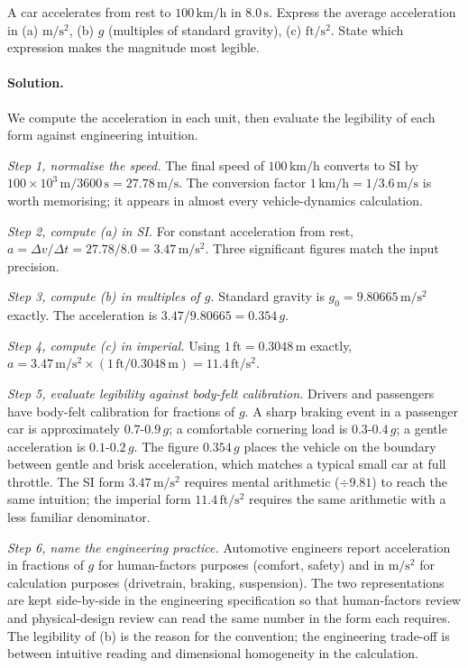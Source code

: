 \begin{exercise}
A car accelerates from rest to $100 \,\si{\kilo\meter\per\hour}$ in
$8.0 \,\si{\second}$. Express the average acceleration in (a)
$\si{\meter\per\second\squared}$, (b) $g$ (multiples of standard
gravity), (c) $\text{ft}/\text{s}^{2}$. State which expression
makes the magnitude most legible.

\paragraph{Solution.}
We compute the acceleration in each unit, then evaluate the
legibility of each form against engineering intuition.

\textit{Step 1, normalise the speed.} The final speed of
$100 \,\si{\kilo\meter\per\hour}$ converts to SI by
$100 \times 10^{3} \,\si{\meter} / 3600 \,\si{\second} =
27.78 \,\si{\meter\per\second}$. The conversion factor
$1 \,\si{\kilo\meter\per\hour} = 1/3.6 \,\si{\meter\per\second}$ is
worth memorising; it appears in almost every vehicle-dynamics
calculation.

\textit{Step 2, compute (a) in SI.} For constant acceleration from
rest, $a = \Delta v / \Delta t = 27.78 / 8.0 = 3.47 \,\si{\meter\per
\second\squared}$. Three significant figures match the input
precision.

\textit{Step 3, compute (b) in multiples of $g$.} Standard gravity is
$g_{0} = 9.80665 \,\si{\meter\per\second\squared}$ exactly. The
acceleration is $3.47 / 9.80665 = 0.354 \,g$.

\textit{Step 4, compute (c) in imperial.} Using
$1 \,\text{ft} = 0.3048 \,\si{\meter}$ exactly,
$a = 3.47 \,\si{\meter\per\second\squared} \times (1 \,\text{ft}/
0.3048 \,\si{\meter}) = 11.4 \,\text{ft}/\text{s}^{2}$.

\textit{Step 5, evaluate legibility against body-felt calibration.}
Drivers and passengers have body-felt calibration for fractions of
$g$. A sharp braking event in a passenger car is approximately
$0.7$-$0.9 \,g$; a comfortable cornering load is $0.3$-$0.4 \,g$; a
gentle acceleration is $0.1$-$0.2 \,g$. The figure $0.354 \,g$ places
the vehicle on the boundary between gentle and brisk acceleration,
which matches a typical small car at full throttle. The SI form
$3.47 \,\si{\meter\per\second\squared}$ requires mental arithmetic
($\div 9.81$) to reach the same intuition; the imperial form
$11.4 \,\text{ft}/\text{s}^{2}$ requires the same arithmetic with a
less familiar denominator.

\textit{Step 6, name the engineering practice.} Automotive engineers
report acceleration in fractions of $g$ for human-factors purposes
(comfort, safety) and in $\si{\meter\per\second\squared}$ for
calculation purposes (drivetrain, braking, suspension). The two
representations are kept side-by-side in the engineering specification
so that human-factors review and physical-design review can read the
same number in the form each requires. The legibility of (b) is the
reason for the convention; the engineering trade-off is between
intuitive reading and dimensional homogeneity in the calculation.
\end{exercise}

